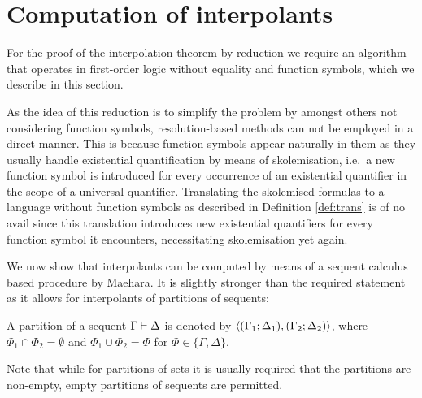 \section{Computation of interpolants}

For the proof of the interpolation theorem by reduction we require an algorithm that operates in first-order logic without equality and function symbols, which we describe in this section.

\begin{remark}
	As the idea of this reduction is to simplify the problem by amongst others not considering function symbols,
	resolution-based methods can not be employed in a direct manner.
	This is because function symbols appear naturally in them as they usually handle existential quantification by means of skolemisation, i.e.~a new function symbol is introduced for every occurrence of an existential quantifier in the scope of a universal quantifier.
	Translating the skolemised formulas to a language without function symbols as described in Definition \ref{def:trans} is of no avail since this translation introduces new existential quantifiers for every function symbol it encounters, necessitating skolemisation yet again.
\end{remark}

We now show that interpolants can be computed by means of a sequent calculus based procedure by Maehara.
It is slightly stronger than the required statement as it allows for interpolants of partitions of sequents:


\begin{defi}
	A {partition} of a sequent $\Gamma \vdash \Delta$ is denoted by $ \langle (\Gamma_1; \Delta_1), (\Gamma_2; \Delta_2)\rangle $, where $\Phi_1 \cap \Phi_2 = \emptyset$ and $\Phi_1 \cup \Phi_2 = \Phi$ for $\Phi \in \{\Gamma, \Delta\}$.
\end{defi}
Note that while for partitions of sets it is usually required that the partitions are non-empty, empty partitions of sequents are permitted.




